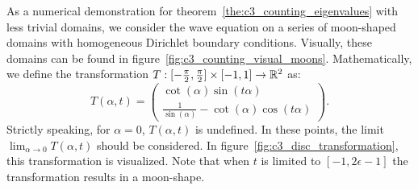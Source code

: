 As a numerical demonstration for theorem~\ref{the:c3_counting_eigenvalues} with less trivial domains, we consider the wave equation on a series of moon-shaped domains with homogeneous Dirichlet boundary conditions. Visually, these domains can be found in figure~\ref{fig:c3_counting_visual_moons}. Mathematically, we define the transformation $T:[-\frac{\pi}{2}, \frac{\pi}{2}] \times [-1, 1] \to \mathbb{R}^2$ as:
\begin{equation}\label{equ:c3_disc_transformation}
  T(\alpha, t) = \begin{pmatrix}
    \cot(\alpha) \sin(t \alpha) \\
    \frac{1}{\sin(\alpha)} - \cot(\alpha) \cos(t \alpha)
  \end{pmatrix}\text{.}
\end{equation}
Strictly speaking, for $\alpha = 0$,  $T(\alpha, t)$ is undefined. In these points, the limit $\lim_{\alpha \to 0} T(\alpha, t)$ should be considered. In figure~\ref{fig:c3_disc_transformation}, this transformation is visualized. Note that when $t$ is limited to $[-1, 2\epsilon -1]$ the transformation results in a moon-shape.

